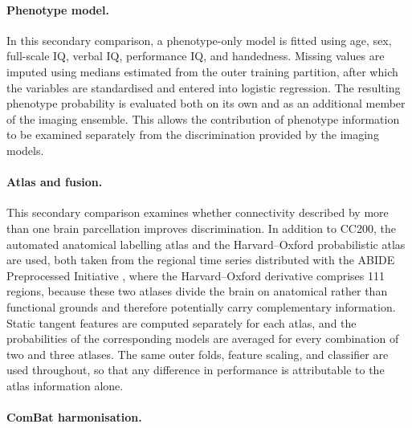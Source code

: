 \paragraph{\textbf{Phenotype model.}}
\label{par:phenotype-model}
In this secondary comparison, a phenotype-only model is fitted using age, sex, full-scale IQ, verbal IQ, performance IQ, and handedness. Missing values are imputed using medians estimated from the outer training partition, after which the variables are standardised and entered into logistic regression. The resulting phenotype probability is evaluated both on its own and as an additional member of the imaging ensemble. This allows the contribution of phenotype information to be examined separately from the discrimination provided by the imaging models.

\paragraph{\textbf{Atlas and fusion.}}
\label{par:atlas-fusion}
This secondary comparison examines whether connectivity described by more than one brain parcellation improves discrimination. In addition to CC200, the automated anatomical labelling atlas \citep{TzourioMazoyeretal2002} and the Harvard--Oxford probabilistic atlas are used, both taken from the regional time series distributed with the ABIDE Preprocessed Initiative \citep{Craddocketal2013}, where the Harvard--Oxford derivative comprises 111 regions, because these two atlases divide the brain on anatomical rather than functional grounds and therefore potentially carry complementary information.  Static tangent features are computed separately for each atlas, and the probabilities of the corresponding models are averaged for every combination of two and three atlases. The same outer folds, feature scaling, and classifier are used throughout, so that any difference in performance is attributable to the atlas information alone.

\paragraph{\textbf{ComBat harmonisation.}}
\label{par:combat-harmonisation}

